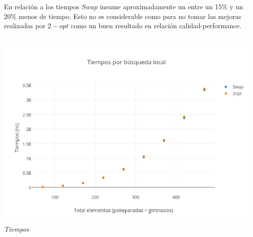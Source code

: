 En relación a los tiempos $Swap$ insume aproximadamente un entre un 15\% y un 20\% menos de tiempo. Esto no es considerable como para no tomar las mejoras realizadas por $2-opt$ como un buen resultado en relación calidad-performance. 
\\\\
\begin{figure}[h] 
 \centering
       \label{fig:randomDist2}
    \label{fig:randomMejora2}
    \end{figure}
 
   \vspace*{0.3cm} \vspace*{0.3cm}
  \begin{center}
	\includegraphics[scale=0.50]{./EJ3/tiemposLocales470.png}
	\label{fig:randomTiempos2}	
	\\{\textit{Tiempos}}
  \end{center}
  \vspace*{0.3cm} 

